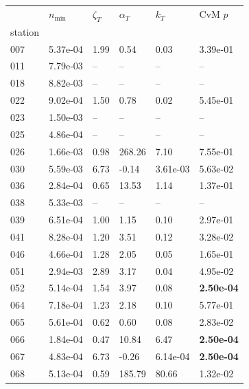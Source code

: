 \begin{figure}[htbp!]
    \centering
    {\footnotesize
    \begin{minipage}[t]{0.48\linewidth}
        \centering
        \begin{tabular}{llllll}
        \toprule
         & $n_{\min}$ & $\zeta_T$ & $\alpha_T$ & $k_T$ & CvM $p$ \\
        station &  &  &  &  &  \\
        \midrule
                    007 & 5.37e-04 & 1.99 & 0.54 & 0.03 & 3.39e-01\\
                    011 & 7.79e-03 & -- & -- & -- & --\\
                    018 & 8.82e-03 & -- & -- & -- & --\\
                    022 & 9.02e-04 & 1.50 & 0.78 & 0.02 & 5.45e-01\\
                    023 & 1.50e-03 & -- & -- & -- & --\\
                    025 & 4.86e-04 & -- & -- & -- & --\\
                    026 & 1.66e-03 & 0.98 & 268.26 & 7.10 & 7.55e-01\\
                    030 & 5.59e-03 & 6.73 & -0.14 & 3.61e-03 & 5.63e-02\\
                    036 & 2.84e-04 & 0.65 & 13.53 & 1.14 & 1.37e-01\\
                    038 & 5.33e-03 & -- & -- & -- & --\\
                    039 & 6.51e-04 & 1.00 & 1.15 & 0.10 & 2.97e-01\\
                    041 & 8.28e-04 & 1.20 & 3.51 & 0.12 & 3.28e-02\\
                    046 & 4.66e-04 & 1.28 & 2.05 & 0.05 & 1.65e-01\\
                    051 & 2.94e-03 & 2.89 & 3.17 & 0.04 & 4.95e-02\\
                    052 & 5.14e-04 & 1.54 & 3.97 & 0.08 & \textbf{2.50e-04}\\
                    064 & 7.18e-04 & 1.23 & 2.18 & 0.10 & 5.77e-01\\
                    065 & 5.61e-04 & 0.62 & 0.60 & 0.08 & 2.83e-02\\
                    066 & 1.84e-04 & 0.47 & 10.84 & 6.47 & \textbf{2.50e-04}\\
                    067 & 4.83e-04 & 6.73 & -0.26 & 6.14e-04 & \textbf{2.50e-04}\\
                    068 & 5.13e-04 & 0.59 & 185.79 & 80.66 & 1.32e-02\\

\end{tabular}
\end{minipage}}
\end{figure}
